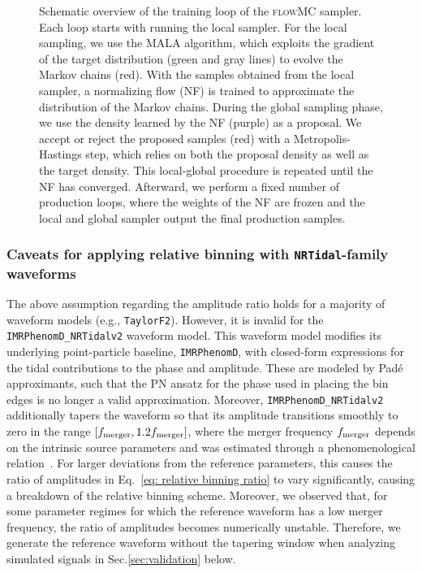 \documentclass[prd,twocolumn,a4paper,floatfix,nofootinbib,preprintnumbers,superscriptaddress]{revtex4-1}
\newcommand{\incfig}[2][0.75\textwidth]{%
    \def\svgwidth{\columnwidth}
    \resizebox{#1}{!}{{#2.pdf_tex}}
}
\begin{document}
\begin{figure}[htpb]
    \centering
    \tiny
    \incfig[\textwidth]{flowMCOverview2}
    \normalsize
    \caption{Schematic overview of the training loop of the \textsc{flowMC} sampler. Each loop starts with running the local sampler. For the local sampling, we use the \ac{MALA} algorithm, which exploits the gradient of the target distribution (green and gray lines) to evolve the Markov chains (red). With the samples obtained from the local sampler, a normalizing flow (NF) is trained to approximate the distribution of the Markov chains. During the global sampling phase, we use the density learned by the NF (purple) as a proposal. We accept or reject the proposed samples (red) with a Metropolis-Hastings step, which relies on both the proposal density as well as the target density. This local-global procedure is repeated until the NF has converged. Afterward, we perform a fixed number of production loops, where the weights of the NF are frozen and the local and global sampler output the final production samples.}
    \label{fig: flowMC diagram}
\end{figure}

\subsubsection{Caveats for applying relative binning with \texttt{NRTidal}-family waveforms}\label{sec: relative binning nrtidal caveat}
The above assumption regarding the amplitude ratio holds for a majority of waveform models (e.g., \texttt{TaylorF2}). However, it is invalid for the \texttt{IMRPhenomD\_NRTidalv2} waveform model. This waveform model modifies its underlying point-particle baseline, \texttt{IMRPhenomD}, with closed-form expressions for the tidal contributions to the phase and amplitude. These are modeled by Padé approximants, such that the \ac{PN} ansatz for the phase used in placing the bin edges is no longer a valid approximation. Moreover, \texttt{IMRPhenomD\_NRTidalv2} additionally tapers the waveform so that its amplitude transitions smoothly to zero in the range ${[f_{\rm merger}, 1.2f_{\rm merger}]}$, where the merger frequency $f_{\rm merger}$ depends on the intrinsic source parameters and was estimated through a phenomenological relation~\cite{Dietrich:2019kaq}. For larger deviations from the reference parameters, this causes the ratio of amplitudes in Eq.~\eqref{eq: relative binning ratio} to vary significantly, causing a breakdown of the relative binning scheme. Moreover, we observed that, for some parameter regimes for which the reference waveform has a low merger frequency, the ratio of amplitudes becomes numerically unstable. Therefore, we generate the reference waveform without the tapering window when analyzing simulated signals in Sec.\ref{sec:validation} below.
\end{document}

